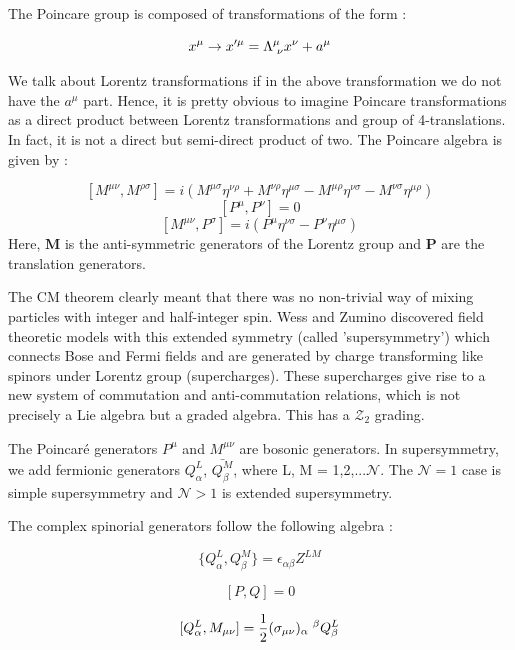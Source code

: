 The Poincare group is composed of transformations of the form :

\[ x^{\mu} \rightarrow x^{\prime \mu} = \Lambda^{\mu}_{\hspace{1mm} \nu} x^{\nu} + a^{\mu} \]

We talk about Lorentz transformations if in the above transformation we do not have the $ a^{\mu}$ part. Hence, it is pretty obvious to
imagine Poincare transformations as a direct product between Lorentz transformations and group of 4-translations. 
In fact, it is not a direct but semi-direct product of two. 
The Poincare algebra is given by :
 
 \[ [M^{\mu\nu} , M^{\rho\sigma}] = i \left (M^{\mu\sigma} \eta^{\nu\rho} + M^{\nu\rho} \eta^{\mu\sigma} - M^{\mu\rho} \eta^{\nu\sigma} - M^{\nu\sigma} \eta^{\mu\rho} \right) \]
 \[ [P^{\mu}, P^{\nu}] = 0 \]
 \[ [M^{\mu\nu}, P^{\sigma}] = i \left(P^{\mu}\eta^{\nu\sigma} - P^{\nu}\eta^{\mu\sigma}\right) \]
Here, $\textbf{M}$ is the anti-symmetric generators of the Lorentz group and $ \textbf{P}$ are the translation generators. 

The CM theorem clearly meant that there was no non-trivial way of mixing particles with integer and half-integer spin. 
Wess and Zumino discovered field theoretic models with this extended symmetry (called 'supersymmetry') 
which connects Bose and Fermi fields and are generated by charge transforming like spinors under Lorentz group 
(supercharges). These supercharges give rise to a new system of commutation and anti-commutation relations, 
which is not precisely a Lie algebra but a graded algebra. This has a $ \mathcal{Z}_{2}$ grading. 


\vspace{3mm}

 The Poincar\'{e} generators $ P^\mu$ and $M^{\mu\nu}$ are bosonic generators. In supersymmetry, we add fermionic generators $Q_{\alpha}^{L}$, $\bar{Q_{\beta}^{M}}$, where
L, M = 1,2,...$\mathcal{N}$. The $\mathcal{N} = 1 $ case is simple supersymmetry and $\mathcal{N}  > 1$ is extended supersymmetry. 

The complex spinorial generators follow the following algebra :

\[ \{Q_{\alpha}^{L}, Q_{\beta}^{M}\} = \epsilon_{\alpha\beta} Z^{LM} \]

\[ [P,Q] = 0 \]

\[ [Q_{\alpha}^{L}, M_{\mu\nu}]  = \frac{1}{2} (\sigma_{\mu\nu})_{\alpha} \hspace{1mm} ^ {\beta} Q_{\beta}^{L} \]  


